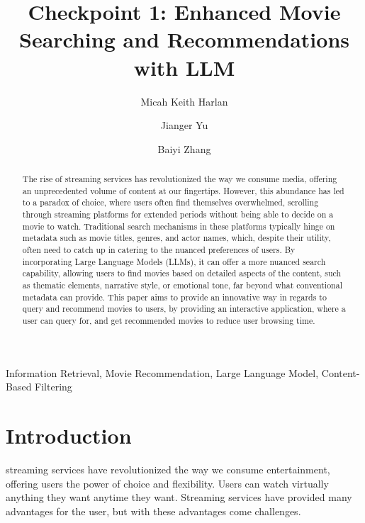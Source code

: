 \documentclass[journal]{IEEEtran}
\theoremstyle{mydefstyle}
\begin{document}
\title{Checkpoint 1: Enhanced Movie Searching and Recommendations with LLM}

\author[1]{Micah Keith Harlan}
\author[1]{Jianger Yu}
\author[1]{Baiyi Zhang}


\maketitle

\begin{abstract}
The rise of streaming services has revolutionized the way we consume media, offering an unprecedented volume of content at our fingertips. However, this abundance has led to a paradox of choice, where users often find themselves overwhelmed, scrolling through streaming platforms for extended periods without being able to decide on a movie to watch. Traditional search mechanisms in these platforms typically hinge on metadata such as movie titles, genres, and actor names, which, despite their utility, often need to catch up in catering to the nuanced preferences of users. By incorporating Large Language Models (LLMs), it can offer a more nuanced search capability, allowing users to find movies based on detailed aspects of the content, such as thematic elements, narrative style, or emotional tone, far beyond what conventional metadata can provide. This paper aims to provide an innovative way in regards to query and recommend movies to users, by providing an interactive application, where a user can query for, and get recommended movies to reduce user browsing time.
\end{abstract}

\begin{IEEEkeywords}
Information Retrieval, Movie Recommendation, Large Language Model, Content-Based Filtering
\end{IEEEkeywords}

\section{Introduction}
 streaming services have revolutionized the way we consume entertainment, offering users the power of choice and flexibility. Users can watch virtually anything they want anytime they want. Streaming services have provided many advantages for the user, but with these advantages come challenges. 
\end{document}
